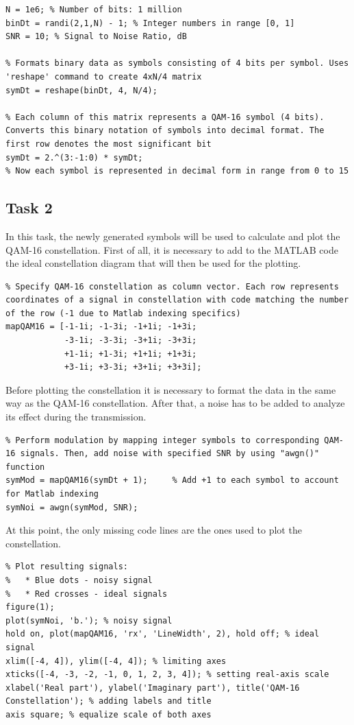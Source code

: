 \begin{lstlisting}
N = 1e6; % Number of bits: 1 million
binDt = randi(2,1,N) - 1; % Integer numbers in range [0, 1]
SNR = 10; % Signal to Noise Ratio, dB

% Formats binary data as symbols consisting of 4 bits per symbol. Uses 'reshape' command to create 4xN/4 matrix
symDt = reshape(binDt, 4, N/4);

% Each column of this matrix represents a QAM-16 symbol (4 bits). Converts this binary notation of symbols into decimal format. The first row denotes the most significant bit
symDt = 2.^(3:-1:0) * symDt;
% Now each symbol is represented in decimal form in range from 0 to 15
\end{lstlisting}

\subsection*{Task 2}
In this task, the newly generated symbols will be used to calculate and plot the QAM-16 constellation. First of all, it is necessary to add to the MATLAB code the ideal constellation diagram that will then be used for the plotting.

\begin{lstlisting}
% Specify QAM-16 constellation as column vector. Each row represents coordinates of a signal in constellation with code matching the number of the row (-1 due to Matlab indexing specifics)
mapQAM16 = [-1-1i; -1-3i; -1+1i; -1+3i;
            -3-1i; -3-3i; -3+1i; -3+3i;
            +1-1i; +1-3i; +1+1i; +1+3i;
            +3-1i; +3-3i; +3+1i; +3+3i];
\end{lstlisting}

\noindent Before plotting the constellation it is necessary to format the data in the same way as the QAM-16 constellation. After that, a noise has to be added to analyze its effect during the transmission.

\begin{lstlisting}
% Perform modulation by mapping integer symbols to corresponding QAM-16 signals. Then, add noise with specified SNR by using "awgn()" function
symMod = mapQAM16(symDt + 1);     % Add +1 to each symbol to account for Matlab indexing
symNoi = awgn(symMod, SNR);
\end{lstlisting}

At this point, the only missing code lines are the ones used to plot the constellation.
\begin{lstlisting}
% Plot resulting signals:
%   * Blue dots - noisy signal
%   * Red crosses - ideal signals
figure(1);
plot(symNoi, 'b.'); % noisy signal
hold on, plot(mapQAM16, 'rx', 'LineWidth', 2), hold off; % ideal signal
xlim([-4, 4]), ylim([-4, 4]); % limiting axes
xticks([-4, -3, -2, -1, 0, 1, 2, 3, 4]); % setting real-axis scale
xlabel('Real part'), ylabel('Imaginary part'), title('QAM-16 Constellation'); % adding labels and title
axis square; % equalize scale of both axes
\end{lstlisting}

